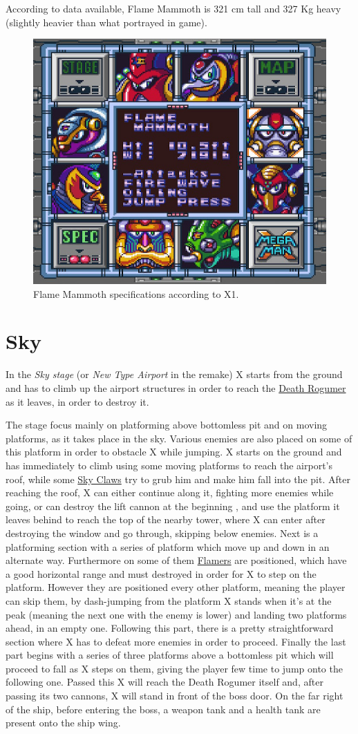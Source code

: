 According to data available, Flame Mammoth is 321 cm tall and 327 Kg heavy (slightly heavier than what portrayed in game).

\begin{figure}[htp]
	\centering
	\includegraphics[width=0.5\linewidth]{figures/X1/Flame_mammoth/Flame_mammoth_specs.jpg}
	\caption{Flame Mammoth specifications according to X1.}
\end{figure}
\section{Sky}
In the \textit{Sky stage} (or \textit{New Type Airport} in the remake) X starts from the ground and has to climb up the airport structures in order to reach the \hyperlink{veichle:Death_Rogumer}{Death Rogumer} as it leaves, in order to destroy it. 

The stage focus mainly on platforming above bottomless pit and on moving platforms, as it takes place in the sky. Various enemies are also placed on some of this platform in order to obstacle X while jumping. X starts on the ground and has immediately to climb using some moving platforms to reach the airport's roof, while some \hyperlink{enem:Sky_Claw}{Sky Claws} try to grub him and make him fall into the pit. After reaching the roof, X can either continue along it, fighting more enemies while going, or can destroy the lift cannon at the beginning , and use the platform it leaves behind to reach the top of the nearby tower, where X can enter after destroying the window and go through, skipping below enemies. Next is a platforming section with a series of platform which move up and down in an alternate way. Furthermore on some of them \hyperlink{enem:Flamer}{Flamers} are positioned, which have a good horizontal range and must destroyed in order for X to step on the platform. However they are positioned every other platform, meaning the player can skip them, by dash-jumping from the platform X stands when it's at the peak (meaning the next one with the enemy is lower) and landing two platforms ahead, in an empty one. Following this part, there is a pretty straightforward section where X has to defeat more enemies in order to proceed. Finally the last part begins with a series of three platforms above a bottomless pit which will proceed to fall as X steps on them, giving the player few time to jump onto the following one. Passed this X will reach the Death Rogumer itself and, after passing its two cannons, X will stand in front of the boss door. On the far right of the ship, before entering the boss, a weapon tank and a health tank are present onto the ship wing.

